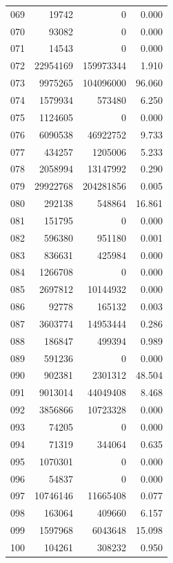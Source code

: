\documentclass[anonymous,notoc]{gmcm2026}
\begin{document}
\begin{longtable}{lrrr}
069 & 19742 & 0 & 0.000 \\
070 & 93082 & 0 & 0.000 \\
071 & 14543 & 0 & 0.000 \\
072 & 22954169 & 159973344 & 1.910 \\
073 & 9975265 & 104096000 & 96.060 \\
074 & 1579934 & 573480 & 6.250 \\
075 & 1124605 & 0 & 0.000 \\
076 & 6090538 & 46922752 & 9.733 \\
077 & 434257 & 1205006 & 5.233 \\
078 & 2058994 & 13147992 & 0.290 \\
079 & 29922768 & 204281856 & 0.005 \\
080 & 292138 & 548864 & 16.861 \\
081 & 151795 & 0 & 0.000 \\
082 & 596380 & 951180 & 0.001 \\
083 & 836631 & 425984 & 0.000 \\
084 & 1266708 & 0 & 0.000 \\
085 & 2697812 & 10144932 & 0.000 \\
086 & 92778 & 165132 & 0.003 \\
087 & 3603774 & 14953444 & 0.286 \\
088 & 186847 & 499394 & 0.989 \\
089 & 591236 & 0 & 0.000 \\
090 & 902381 & 2301312 & 48.504 \\
091 & 9013014 & 44049408 & 8.468 \\
092 & 3856866 & 10723328 & 0.000 \\
093 & 74205 & 0 & 0.000 \\
094 & 71319 & 344064 & 0.635 \\
095 & 1070301 & 0 & 0.000 \\
096 & 54837 & 0 & 0.000 \\
097 & 10746146 & 11665408 & 0.077 \\
098 & 163064 & 409660 & 6.157 \\
099 & 1597968 & 6043648 & 15.098 \\
100 & 104261 & 308232 & 0.950 \\
\end{longtable}
\end{document}

